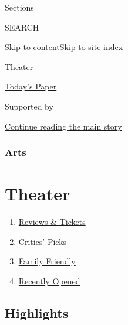Sections

SEARCH

\protect\hyperlink{site-content}{Skip to
content}\protect\hyperlink{site-index}{Skip to site index}

\href{https://www.nytimes3xbfgragh.onion/section/theater}{Theater}

\href{https://myaccount.nytimes3xbfgragh.onion/auth/login?response_type=cookie\&client_id=vi}{}

\href{https://www.nytimes3xbfgragh.onion/section/todayspaper}{Today's
Paper}

Supported by

\protect\hyperlink{after-sponsor}{Continue reading the main story}

\hypertarget{arts}{%
\subsubsection{\texorpdfstring{\href{arts}{Arts}}{Arts}}\label{arts}}

\hypertarget{theater}{%
\section{Theater}\label{theater}}

\begin{enumerate}
\def\labelenumi{\arabic{enumi}.}
\tightlist
\item
  \href{/reviews/theater}{Reviews \& Tickets}
\item
  \href{/reviews/theater/critics-pick}{Critics' Picks}
\item
  \href{/reviews/theater/family-friendly}{Family Friendly}
\item
  \href{/reviews/theater/recently-opened}{Recently Opened}
\end{enumerate}

\hypertarget{highlights}{%
\subsection{Highlights}\label{highlights}}

